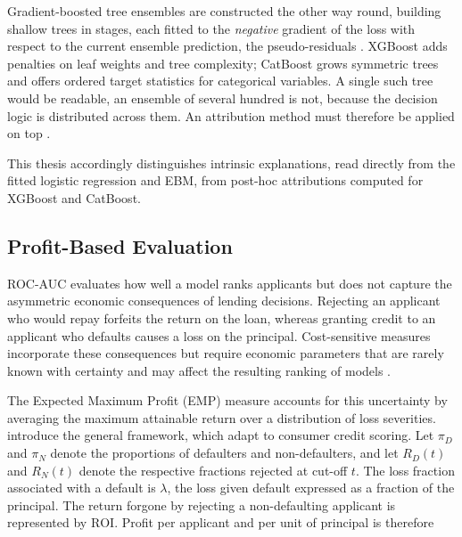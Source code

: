 Gradient-boosted tree ensembles are constructed the other way round, building shallow
trees in stages, each fitted to the \emph{negative} gradient of the loss with respect to
the current ensemble prediction, the pseudo-residuals \citep{friedmanGreedyFunctionApproximation2001}. XGBoost \citep{chenXGBoostScalableTree2016} adds penalties on
leaf weights and tree complexity; CatBoost \citep{prokhorenkovaCatBoostUnbiasedBoosting2018} grows symmetric
trees and offers ordered target statistics for categorical variables. A single such
tree would be readable, an
ensemble of several hundred is not, because the decision logic is distributed across
them. An attribution method must therefore be applied on top \citep{zouInterpretableCreditScoring2025}.

This thesis accordingly distinguishes intrinsic explanations, read directly from the
fitted logistic regression and EBM, from post-hoc attributions computed for XGBoost and
CatBoost.



\subsection{Profit-Based Evaluation}\label{sec:emp}

ROC-AUC evaluates how well a model ranks applicants but does not capture
the asymmetric economic consequences of lending decisions. Rejecting an
applicant who would repay forfeits the return on the loan, whereas granting
credit to an applicant who defaults causes a loss on the principal.
Cost-sensitive measures incorporate these consequences but require economic
parameters that are rarely known with certainty and may affect the resulting
ranking of models
\citep{verbrakenDevelopmentApplicationConsumer2014}.

The Expected Maximum Profit (EMP) measure accounts for this uncertainty by
averaging the maximum attainable return over a distribution of loss severities.
\citet{verbrakenNovelProfitMaximizing2013a} introduce the general framework,
which \citet{verbrakenDevelopmentApplicationConsumer2014} adapt to consumer
credit scoring. Let $\pi_D$ and $\pi_N$ denote the proportions of defaulters
and non-defaulters, and let $R_D(t)$ and $R_N(t)$ denote the respective
fractions rejected at cut-off $t$. The loss fraction associated with a default
is $\lambda$, the loss given default expressed as a fraction of the principal.
The return forgone by rejecting a non-defaulting applicant is represented by
$\mathrm{ROI}$. Profit per applicant and per unit of principal is therefore

